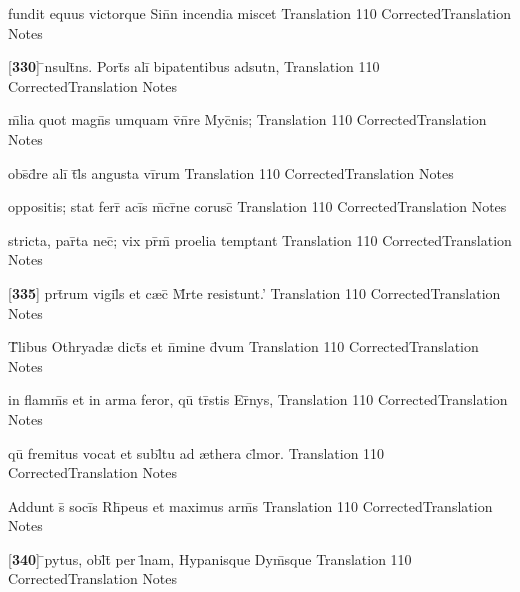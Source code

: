 \latline
  {fundit equus victorque Sin\={}n incendia miscet}
  { Translation }
  {110}
  { CorrectedTranslation }
  { Notes }


\latline
  {[\textbf{330}] \={\macron {\i}}nsult\={}ns.  Port\={\macron {\i}}s ali\={\macron {\i}} bipatentibus adsutn,}
  { Translation }
  {110}
  { CorrectedTranslation }
  { Notes }


\latline
  {m\={\macron {\i}}lia quot magn\={\macron {\i}}s umquam v\={}n\={}re Myc\={}nis;}
  { Translation }
  {110}
  { CorrectedTranslation }
  { Notes }


\latline
  {obs\={}d\={}re ali\={\macron {\i}} t\={}l\={\macron {\i}}s angusta vi\={}rum}
  { Translation }
  {110}
  { CorrectedTranslation }
  { Notes }


\latline
  {oppositis; stat ferr\={\macron {\i}} aci\={}s m\={}cr\={}ne corusc\={}}
  { Translation }
  {110}
  { CorrectedTranslation }
  { Notes }


\latline
  {stricta, par\={}ta nec\={\macron {\i}}; vix pr\={\macron {\i}}m\={\macron {\i}} proelia temptant}
  { Translation }
  {110}
  { CorrectedTranslation }
  { Notes }


\latline
  {[\textbf{335}] prt\={}rum vigil\={}s et c{\ae}c\={} M\={}rte resistunt.'}
  { Translation }
  {110}
  { CorrectedTranslation }
  { Notes }


\latline
  {T\={}libus Othryad{\ae} dict\={\macron {\i}}s et n\={}mine d\={\macron {\i}}vum}
  { Translation }
  {110}
  { CorrectedTranslation }
  { Notes }


\latline
  {in flamm\={}s et in arma feror, qu\={} tr\={\macron {\i}}stis Er\={\macron {\i}}nys,}
  { Translation }
  {110}
  { CorrectedTranslation }
  { Notes }


\latline
  {qu\={} fremitus vocat et subl\={}tu ad {\ae}thera cl\={}mor.}
  { Translation }
  {110}
  { CorrectedTranslation }
  { Notes }


\latline
  {Addunt s\={} soci\={}s Rh\={\macron {\i}}peus et maximus arm\={\macron {\i}}s}
  { Translation }
  {110}
  { CorrectedTranslation }
  { Notes }


\latline
  {[\textbf{340}] \={}pytus, obl\={}t\={\macron {\i}} per l\={}nam, Hypanisque Dym\={}sque}
  { Translation }
  {110}
  { CorrectedTranslation }
  { Notes }



